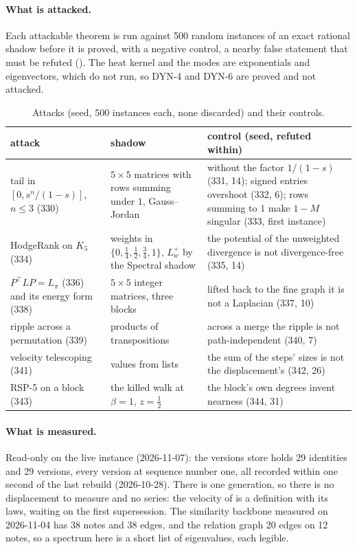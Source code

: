 \documentclass[11pt,a4paper]{article}
\theoremstyle{plain}
\theoremstyle{definition}
\theoremstyle{remark}
\begin{document}
\paragraph{What is attacked.}
Each attackable theorem is run against 500 random instances of an exact rational shadow before
it is proved, with a negative control, a nearby false statement that must be refuted
(). The heat kernel and the modes are exponentials and eigenvectors, which do
not run, so DYN-4 and DYN-6 are proved and not attacked.

\begin{table}[t]
\centering
\caption{Attacks (seed, 500 instances each, none discarded) and their controls.}
\label{tab:attacks}
\small
\begin{tabular}{@{}p{3.4cm}p{3.6cm}p{4.8cm}@{}}
\toprule
attack & shadow & control (seed, refuted within) \\
\midrule
tail in $[0, s^n/(1-s)]$, $n \le 3$ (330) & $5\times5$ matrices with rows summing under $1$,
  Gauss--Jordan & without the factor $1/(1-s)$ (331, 14); signed entries overshoot (332, 6); rows
  summing to $1$ make $1-M$ singular (333, first instance) \\
HodgeRank on $K_5$ (334) & weights in $\{0,\tfrac14,\tfrac12,\tfrac34,1\}$, $L_w^{+}$ by the
  Spectral shadow & the potential of the unweighted divergence is not divergence-free (335, 14) \\
$P^{\top}LP = L_\pi$ (336) and its energy form (338) & $5\times5$ integer matrices, three blocks &
  lifted back to the fine graph it is not a Laplacian (337, 10) \\
ripple across a permutation (339) & products of transpositions & across a merge the ripple is not
  path-independent (340, 7) \\
velocity telescoping (341) & values from lists & the sum of the steps' sizes is not the
  displacement's (342, 26) \\
RSP-5 on a block (343) & the killed walk at $\beta=1$, $z=\tfrac12$ & the block's own degrees
  invent nearness (344, 31) \\
\bottomrule
\end{tabular}
\end{table}

\paragraph{What is measured.}
Read-only on the live instance (2026-11-07): the versions store holds 29 identities and 29
versions, every version at sequence number one, all recorded within one second of the last rebuild
(2026-10-28). There is one generation, so there is no displacement to measure and no series: the
velocity of  is a definition with its laws, waiting on the first supersession.
The similarity backbone measured on 2026-11-04 has 38 notes and 38 edges, and the relation graph
20 edges on 12 notes, so a spectrum here is a short list of eigenvalues, each legible.
\end{document}
